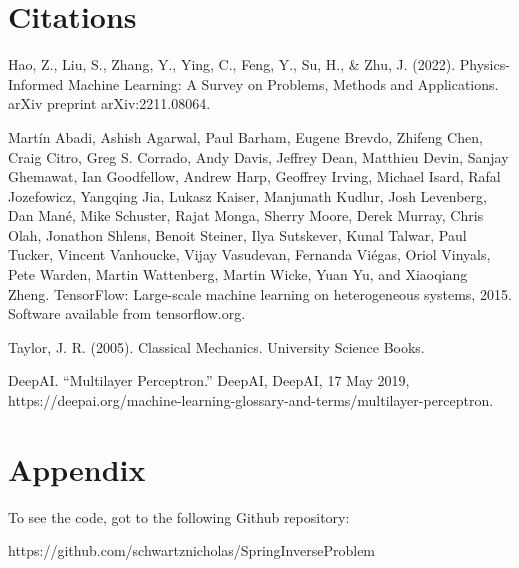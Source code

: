 \documentclass[12pt]{article}
\begin{document}
	\section*{Citations}
Hao, Z., Liu, S., Zhang, Y., Ying, C., Feng, Y., Su, H., \& Zhu, J. (2022). Physics-Informed Machine Learning: A Survey on Problems, Methods and Applications. arXiv preprint arXiv:2211.08064.\newline

Martín Abadi, Ashish Agarwal, Paul Barham, Eugene Brevdo,
Zhifeng Chen, Craig Citro, Greg S. Corrado, Andy Davis,
Jeffrey Dean, Matthieu Devin, Sanjay Ghemawat, Ian Goodfellow,
Andrew Harp, Geoffrey Irving, Michael Isard, Rafal Jozefowicz, Yangqing Jia,
Lukasz Kaiser, Manjunath Kudlur, Josh Levenberg, Dan Mané, Mike Schuster,
Rajat Monga, Sherry Moore, Derek Murray, Chris Olah, Jonathon Shlens,
Benoit Steiner, Ilya Sutskever, Kunal Talwar, Paul Tucker,
Vincent Vanhoucke, Vijay Vasudevan, Fernanda Viégas,
Oriol Vinyals, Pete Warden, Martin Wattenberg, Martin Wicke,
Yuan Yu, and Xiaoqiang Zheng.
TensorFlow: Large-scale machine learning on heterogeneous systems,
2015. Software available from tensorflow.org. \newline

Taylor, J. R. (2005). Classical Mechanics. University Science Books. \newline
	
DeepAI. “Multilayer Perceptron.” DeepAI, DeepAI, 17 May 2019, https://deepai.org/machine-learning-glossary-and-terms/multilayer-perceptron. 
	\section*{Appendix}

	To see the code, got to the following Github repository:

	https://github.com/schwartznicholas/SpringInverseProblem
	
\end{document}
